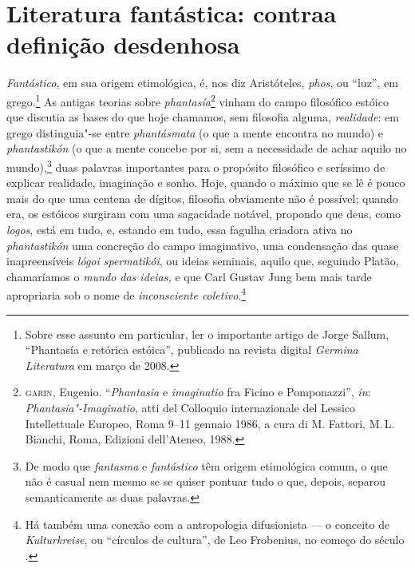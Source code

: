 \section{Literatura fantástica: contra\break a definição desdenhosa}

\emph{Fantástico}, em sua origem etimológica, é, nos diz Aristóteles,
\emph{phos}, ou ``luz'', em grego.\footnote{Sobre esse assunto em
  particular, ler o importante artigo de Jorge Sallum, ``Phantasía e
  retórica estóica'', publicado na revista digital \emph{Germina
  Literatura} em março de 2008.} As antigas teorias sobre
\emph{phantasía}\footnote{\textsc{garin}, Eugenio. ``\emph{Phantasia} e
  \emph{imaginatio} fra Ficino e Pomponazzi'', \emph{in}:
  \emph{Phantasia"-Imaginatio}, atti del  Colloquio internazionale del
  Lessico Intellettuale Europeo, Roma 9--11 gennaio 1986, a cura di M.
  Fattori, M.\,L.\,Bianchi, Roma, Edizioni dell'Ateneo, 1988.} vinham do
campo filosófico estóico que discutia as bases do que hoje chamamos, sem
filosofia alguma, \emph{realidade}: em grego distinguia"-se entre
\emph{phantásmata} (o que a mente encontra no mundo) e
\emph{phantastikón} (o que a mente concebe por si, sem a necessidade de
achar aquilo no mundo),\footnote{De modo que \emph{fantasma} e
  \emph{fantástico} têm origem etimológica comum, o que não é casual nem
  mesmo se se quiser pontuar tudo o que, depois, separou semanticamente
  as duas palavras.} duas palavras importantes para o propósito
filosófico e seríssimo de explicar realidade, imaginação e sonho. Hoje,
quando o máximo que se lê é pouco mais do que uma centena de dígitos,
filosofia obviamente não é possível; quando era, os estóicos surgiram
com uma sagacidade notável, propondo que deus, como \emph{logos}, está
em tudo, e, estando em tudo, essa fagulha criadora ativa no
\emph{phantastikón} uma concreção do campo imaginativo, uma condensação
das quase inapreensíveis \emph{lógoi spermatikói}, ou ideias seminais,
aquilo que, seguindo Platão, chamaríamos o \emph{mundo das ideias,} e
que Carl Gustav Jung bem mais tarde apropriaria sob o nome de
\emph{inconsciente coletivo}.\footnote{Há também uma conexão com a
  antropologia difusionista --- o conceito de \emph{Kulturkreise}, ou
  ``círculos de cultura'', de Leo Frobenius, no começo do século .}

